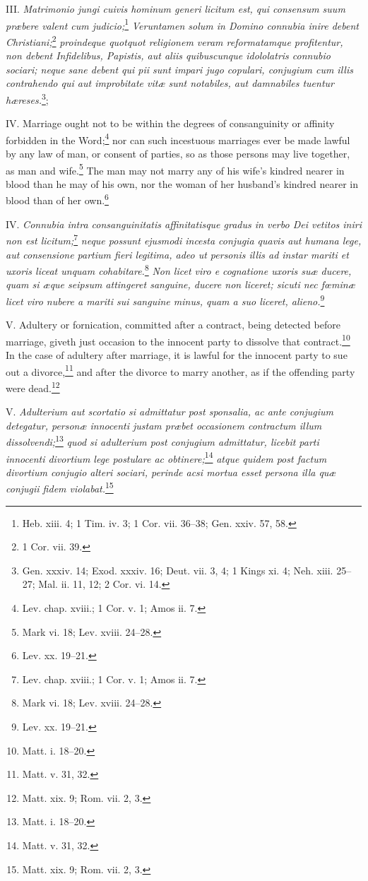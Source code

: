 III. \emph{Matrimonio jungi cuivis hominum generi licitum est, qui consensum suum præbere valent cum judicio;}\footnote{Heb. xiii. 4; 1 Tim. iv. 3; 1 Cor. vii. 36–38; Gen. xxiv. 57, 58.}\emph{ Veruntamen solum in Domino connubia inire debent Christiani;}\footnote{1 Cor. vii. 39.}\emph{ proindeque quotquot religionem veram reformatamque profitentur, non debent Infidelibus, Papistis, aut aliis quibuscunque idololatris connubio sociari; neque sane debent qui pii sunt impari jugo copulari, conjugium cum illis contrahendo qui aut improbitate vitæ sunt notabiles, aut damnabiles tuentur hæreses.}\footnote{Gen. xxxiv. 14; Exod. xxxiv. 16; Deut. vii. 3, 4; 1 Kings xi. 4; Neh. xiii. 25–27; Mal. ii. 11, 12; 2 Cor. vi. 14.};

IV. Marriage ought not to be within the degrees of consanguinity or affinity forbidden in the Word;\footnote{Lev. chap. xviii.; 1 Cor. v. 1; Amos ii. 7.} nor can such incestuous marriages ever be made lawful by any law of man, or consent of parties, so as those persons may live together, as man and wife.\footnote{Mark vi. 18; Lev. xviii. 24–28.} The man may not marry any of his wife's kindred nearer in blood than he may of his own, nor the woman of her husband's kindred nearer in blood than of her own.\footnote{Lev. xx. 19–21.}

IV. \emph{Connubia intra consanguinitatis affinitatisque gradus in verbo Dei vetitos iniri non est licitum;}\footnote{Lev. chap. xviii.; 1 Cor. v. 1; Amos ii. 7.}\emph{ neque possunt ejusmodi incesta conjugia quavis aut humana lege, aut consensione partium fieri legitima, adeo ut personis illis ad instar mariti et uxoris liceat unquam cohabitare.}\footnote{Mark vi. 18; Lev. xviii. 24–28.}\emph{ Non licet viro e cognatione uxoris suæ ducere, quam si æque seipsum attingeret sanguine, ducere non liceret; sicuti nec fœminæ licet viro nubere a mariti sui sanguine minus, quam a suo liceret, alieno.}\footnote{Lev. xx. 19–21.}

V. Adultery or fornication, committed after a contract, being detected before marriage, giveth just occasion to the innocent party to dissolve that contract.\footnote{Matt. i. 18–20.} In the case of adultery after marriage, it is lawful for the innocent party to sue out a divorce,\footnote{Matt. v. 31, 32.} and after the divorce to marry another, as if the offending party were dead.\footnote{Matt. xix. 9; Rom. vii. 2, 3.}

V. \emph{Adulterium aut scortatio si admittatur post sponsalia, ac ante conjugium detegatur, personæ innocenti justam præbet occasionem contractum illum dissolvendi;}\footnote{Matt. i. 18–20.}\emph{ quod si adulterium post conjugium admittatur, licebit parti innocenti divortium lege postulare ac obtinere;}\footnote{Matt. v. 31, 32.}\emph{ atque quidem post factum divortium conjugio alteri sociari, perinde acsi mortua esset persona illa quæ conjugii fidem violabat.}\footnote{Matt. xix. 9; Rom. vii. 2, 3.}

